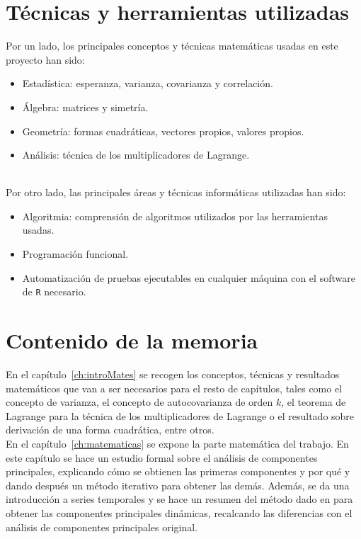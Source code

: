 \section{Técnicas y herramientas utilizadas}
Por un lado, los principales conceptos y técnicas matemáticas usadas en este proyecto han sido:
\begin{itemize}
\item Estadística: esperanza, varianza, covarianza y correlación.
\item Álgebra: matrices y simetría.
\item Geometría: formas cuadráticas, vectores propios, valores propios.
\item Análisis: técnica de los multiplicadores de Lagrange.
\end{itemize}
\textit{ }\\
Por otro lado, las principales áreas y técnicas informáticas utilizadas han sido:
\begin{itemize}
\item Algoritmia: comprensión de algoritmos utilizados por las herramientas usadas.
\item Programación funcional.
\item Automatización de pruebas ejecutables en cualquier máquina con el software de \texttt{R} necesario.
\end{itemize}


\section{Contenido de la memoria}
En el capítulo~\ref{ch:introMates} se recogen los conceptos, técnicas y resultados matemáticos que van a ser necesarios para el resto de capítulos, tales como el concepto de varianza, el concepto de autocovarianza de orden $k$, el teorema de Lagrange para la técnica de los multiplicadores de Lagrange o el resultado sobre derivación de una forma cuadrática, entre otros.\\

En el capítulo~\ref{ch:matematicas} se expone la parte matemática del trabajo. En este capítulo se hace un estudio formal sobre el análisis de componentes principales, explicando cómo se obtienen las primeras componentes y por qué y dando después un método iterativo para obtener las demás. Además, se da una introducción a series temporales y se hace un resumen del método dado en \cite{pena16} para obtener las componentes principales dinámicas, recalcando las diferencias con el análisis de componentes principales original.\\ %

